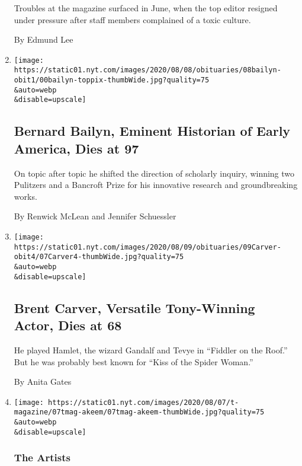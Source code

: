 \begin{enumerate}
  Troubles at the magazine surfaced in June, when the top editor
  resigned under pressure after staff members complained of a toxic
  culture.

  By Edmund Lee
\item
  \href{/2020/08/07/books/bernard-bailyn-dead.html}{}

  \texttt{[image: https://static01.nyt.com/images/2020/08/08/obituaries/08bailyn-obit1/00bailyn-toppix-thumbWide.jpg?quality=75\\\&auto=webp\\\&disable=upscale]}

  \hypertarget{bernard-bailyn-eminent-historian-of-early-america-dies-at-97}{%
  \subsection{Bernard Bailyn, Eminent Historian of Early America, Dies
  at
  97}\label{bernard-bailyn-eminent-historian-of-early-america-dies-at-97}}

  On topic after topic he shifted the direction of scholarly inquiry,
  winning two Pulitzers and a Bancroft Prize for his innovative research
  and groundbreaking works.

  By Renwick McLean and Jennifer Schuessler
\item
  \href{/2020/08/07/theater/brent-carver-dead.html}{}

  \texttt{[image: https://static01.nyt.com/images/2020/08/09/obituaries/09Carver-obit4/07Carver4-thumbWide.jpg?quality=75\\\&auto=webp\\\&disable=upscale]}

  \hypertarget{brent-carver-versatile-tony-winning-actor-dies-at-68}{%
  \subsection{Brent Carver, Versatile Tony-Winning Actor, Dies at
  68}\label{brent-carver-versatile-tony-winning-actor-dies-at-68}}

  He played Hamlet, the wizard Gandalf and Tevye in ``Fiddler on the
  Roof.'' But he was probably best known for ``Kiss of the Spider
  Woman.''

  By Anita Gates
\item
  \href{/2020/08/07/t-magazine/akeem-smith-art.html}{}

  \texttt{[image: https://static01.nyt.com/images/2020/08/07/t-magazine/07tmag-akeem/07tmag-akeem-thumbWide.jpg?quality=75\\\&auto=webp\\\&disable=upscale]}

  \hypertarget{the-artists}{%
  \subsubsection{The Artists}\label{the-artists}}


\end{enumerate}
